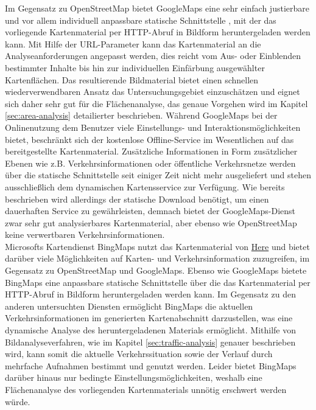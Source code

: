 Im Gegensatz zu OpenStreetMap bietet GoogleMaps eine sehr einfach justierbare und vor allem individuell anpassbare statische Schnittstelle \cite{googlestaticmap}, mit der das vorliegende Kartenmaterial per HTTP-Abruf in Bildform heruntergeladen werden kann. Mit Hilfe der URL-Parameter kann das Kartenmaterial an die Analyseanforderungen angepasst werden, dies reicht vom Aus- oder Einblenden bestimmter Inhalte bis hin zur individuellen Einfärbung ausgewählter Kartenflächen. Das resultierende Bildmaterial bietet einen schnellen wiederverwendbaren Ansatz das Untersuchungsgebiet einzuschätzen und eignet sich daher sehr gut für die Flächenanalyse, das genaue Vorgehen wird im Kapitel \ref{sec:area-analysis} detailierter beschrieben. Während GoogleMaps bei der Onlinenutzung dem Benutzer viele Einstellungs- und Interaktionsmöglichkeiten bietet, beschränkt sich der kostenlose Offline-Service im Wesentlichen auf das bereitgestellte Kartenmaterial. Zusätzliche Informationen in Form zusätzlicher Ebenen wie z.B. Verkehrsinformationen oder öffentliche Verkehrsnetze werden über die statische Schnittstelle seit einiger Zeit nicht mehr ausgeliefert und stehen ausschließlich dem dynamischen Kartensservice zur Verfügung. Wie bereits beschrieben wird allerdings der statische Download benötigt, um einen dauerhaften Service zu gewährleisten, demnach bietet der GoogleMaps-Dienst zwar sehr gut analysierbares Kartenmaterial, aber ebenso wie OpenStreetMap keine verwertbaren Verkehrsinformationen.\\

Microsofts Kartendienst BingMaps nutzt das Kartenmaterial von \href{https://here.com/}{Here} und bietet darüber viele Möglichkeiten auf Karten- und Verkehrsinformation zuzugreifen, im Gegensatz zu OpenStreetMap und GoogleMaps. Ebenso wie GoogleMaps bietete BingMaps eine anpassbare statische Schnittstelle \cite{bingstaticmap} über die das Kartenmaterial per HTTP-Abruf in Bildform heruntergeladen werden kann. Im Gegensatz zu den anderen untersuchten Diensten ermöglicht BingMaps die aktuellen Verkehrsinformationen im generierten Kartenabschnitt darzustellen, was eine dynamische Analyse des heruntergeladenen Materials ermöglicht. Mithilfe von Bildanalyseverfahren, wie im Kapitel \ref{sec:traffic-analysis} genauer beschrieben wird, kann somit die aktuelle Verkehrssituation sowie der Verlauf durch mehrfache Aufnahmen bestimmt und genutzt werden. Leider bietet BingMaps darüber hinaus nur bedingte Einstellungsmöglichkeiten, weshalb eine Flächenanalyse des vorliegenden Kartenmaterials unnötig erschwert werden würde.\\

